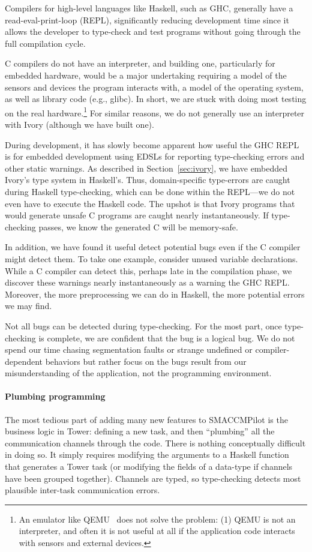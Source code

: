 Compilers for high-level languages like Haskell, such as GHC, generally have a
read-eval-print-loop (REPL), significantly reducing development time since it
allows the developer to type-check and test programs without going through the
full compilation cycle.

C compilers do not have an interpreter, and building one, particularly for embedded
hardware, would be a major undertaking requiring a model of the sensors and
devices the program interacts with, a model of the operating system, as well as
library code (e.g., glibc).  In short, we are stuck with doing most testing on
the real hardware.\footnote{An emulator like QEMU~\cite{} does not solve the
  problem: (1) QEMU is not an interpreter, and often it is not useful at all if
  the application code interacts with sensors and external devices.}  For
similar reasons, we do not generally use an interpreter with Ivory (although we
have built one).

During development, it has slowly become apparent how useful the GHC REPL is for
embedded development using EDSLs for reporting type-checking errors and other
static warnings.  As described in Section~\ref{sec:ivory}, we have embedded
Ivory's type system in Haskell's.  Thus, domain-specific type-errors are caught
during Haskell type-checking, which can be done within the REPL---we do not even
have to execute the Haskell code.  The upshot is that Ivory programs that would
generate unsafe C programs are caught nearly instantaneously.  If type-checking
passes, we know the generated C will be memory-safe.

In addition, we have found it useful detect potential bugs even if the C
compiler might detect them.  To take one example, consider unused variable
declarations.  While a C compiler can detect this, perhaps late in the
compilation phase, we discover these warnings nearly instantaneously as a
warning the GHC REPL.  Moreover, the more preprocessing we can do in Haskell,
the more potential errors we may find.

Not all bugs can be detected during type-checking.  For the most part, once
type-checking is complete, we are confident that the bug is a logical bug.  We
do not spend our time chasing segmentation faults or strange undefined or
compiler-dependent behaviors but rather focus on the bugs result from our
misunderstanding of the application, not the programming environment.


\paragraph{Plumbing programming}
The most tedious part of adding many new features to SMACCMPilot is the business
logic in Tower: defining a new task, and then ``plumbing'' all the communication
channels through the code.  There is nothing conceptually difficult in doing so.
It simply requires modifying the arguments to a Haskell function that generates
a Tower task (or modifying the fields of a data-type if channels have been
grouped together).  Channels are typed, so type-checking detects most plausible
inter-task communication errors.

